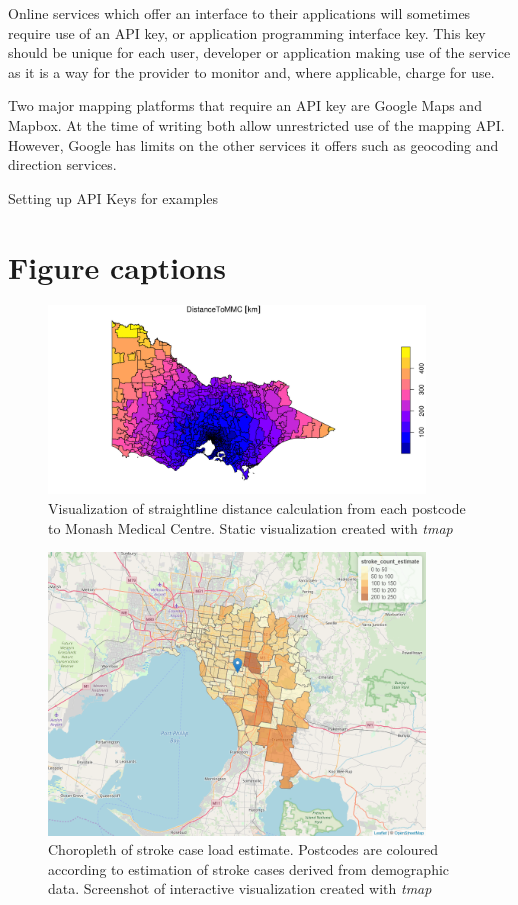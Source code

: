 \documentclass[utf8]{frontiersHLTH}
\begin{document}
Online services which offer an interface to their applications will
sometimes require use of an API key, or application programming
interface key. This key should be unique for each user, developer or
application making use of the service as it is a way for the provider to
monitor and, where applicable, charge for use.

Two major mapping platforms that require an API key are Google Maps and
Mapbox. At the time of writing both allow unrestricted use of the
mapping API. However, Google has limits on the other services it offers
such as geocoding and direction services.

Setting up API Keys for examples

\section*{Figure captions}

\begin{figure}[h!]
\begin{center}
\includegraphics[width=10cm]{distance_mmc}
\end{center}
\caption{Visualization of straightline distance calculation from each postcode to Monash Medical Centre. Static visualization created with {\em tmap}}\label{fig:DistanceToMMC}
\end{figure}

\begin{figure}[h!]
\begin{center}
\includegraphics[width=10cm]{choropleth}
\end{center}
\caption{Choropleth of stroke case load estimate. Postcodes are coloured according to estimation of stroke cases derived from demographic data. Screenshot of interactive visualization created with {\em tmap}}\label{fig:choropleth}
\end{figure}
\end{document}
